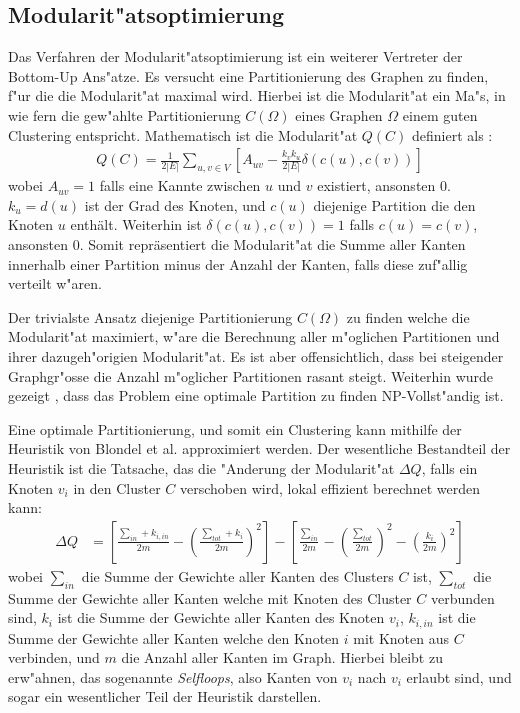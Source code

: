 \documentclass[journal]{vgtc}
\begin{document}
  
  \subsection{Modularit"atsoptimierung}
    \label{sec:modularity}
    Das Verfahren der Modularit"atsoptimierung ist ein weiterer Vertreter der Bottom-Up Ans"atze. Es versucht eine Partitionierung
    des Graphen zu finden, f"ur die die Modularit"at maximal wird. Hierbei ist die Modularit"at ein Ma"s, in wie fern die gew"ahlte
    Partitionierung $C(\Omega)$ eines Graphen $\Omega$ einem guten Clustering entspricht.
    Mathematisch ist die Modularit"at $Q(C)$ definiert als \cite{modularity}:
    \begin{align}
      Q(C)=\frac{1}{2|E|}\sum\limits_{u,v \in V}\left[ A_{uv} - \frac {k_vk_u}{2|E|}\delta \left( c(u), c(v)\right) \right]
    \end{align}
    wobei $A_{uv}=1$ falls eine Kannte zwischen $u$ und $v$ existiert, ansonsten 0. $k_u = d(u)$ ist der Grad des Knoten, und
    $c(u)$ diejenige Partition die den Knoten $u$ enthält. Weiterhin ist $\delta \left(c(u),c(v)\right)=1$ falls $c(u)=c(v)$,
    ansonsten 0.
    Somit repräsentiert die Modularit"at die Summe aller Kanten innerhalb einer Partition minus der Anzahl der Kanten, falls diese 
    zuf"allig verteilt w"aren.
    
    Der trivialste Ansatz diejenige Partitionierung $C(\Omega)$ zu finden welche die Modularit"at maximiert, w"are die Berechnung
    aller m"oglichen Partitionen und ihrer dazugeh"origien Modularit"at. Es ist aber offensichtlich, dass bei steigender 
    Graphgr"osse die Anzahl m"oglicher Partitionen rasant steigt. Weiterhin wurde gezeigt \cite{modularity_nphard}, dass das Problem
    eine optimale Partition zu finden NP-Vollst"andig ist.
    
    Eine optimale Partitionierung, und somit ein Clustering kann mithilfe der Heuristik von Blondel et al. \cite{modularity_heuristic}
    approximiert werden. Der wesentliche Bestandteil
    der Heuristik ist die Tatsache, das die "Anderung der Modularit"at $\Delta Q$, falls ein Knoten $v_i$ in den Cluster $C$ verschoben
    wird, lokal effizient berechnet werden kann:
    \begin{align}
     \Delta Q &= \left[ \frac{\sum_{in}+k_{i,in}}{2m} - \left( \frac{\sum_{tot}+k_i}{2m} \right)^2 \right] -
     \left[ \frac{\sum_{in}}{2m} - \left( \frac{\sum_{tot}}{2m} \right)^2 - \left( \frac{k_i}{2m} \right)^2 \right]
    \end{align}
    wobei $\sum_{in}$ die Summe der Gewichte aller Kanten des Clusters $C$ ist, $\sum_{tot}$ die Summe der Gewichte aller Kanten welche
    mit Knoten des Cluster $C$ verbunden sind, $k_i$ ist die Summe der Gewichte aller Kanten des Knoten $v_i$, $k_{i,in}$ ist die
    Summe der Gewichte aller Kanten welche den Knoten $i$ mit Knoten aus $C$ verbinden, und $m$ die Anzahl aller Kanten im Graph.
    Hierbei bleibt zu erw"ahnen, das sogenannte \emph{Selfloops}, also Kanten von $v_i$ nach $v_i$ erlaubt sind, und sogar
    ein wesentlicher Teil der Heuristik darstellen.
    
\end{document}
